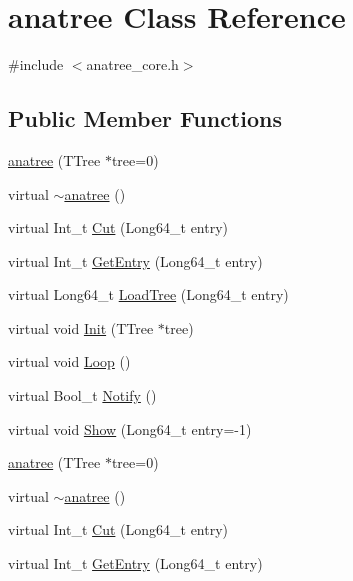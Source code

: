\hypertarget{classanatree}{\section{anatree Class Reference}
\label{classanatree}
}


{\ttfamily \#include $<$anatree\-\_\-core.\-h$>$}

\subsection*{Public Member Functions}
\begin{DoxyCompactItemize}
\item 
\hyperlink{classanatree_a681468883d8d6ce67ef59bc627336ae7}{anatree} (T\-Tree $\ast$tree=0)
\item 
virtual \hyperlink{classanatree_abf15dc362f9cb8d08ebcb1811c649a35}{$\sim$anatree} ()
\item 
virtual Int\-\_\-t \hyperlink{classanatree_af469e80902746c85deeab7a0e1b13b59}{Cut} (Long64\-\_\-t entry)
\item 
virtual Int\-\_\-t \hyperlink{classanatree_a3ead58a94b63a5af3188b31514693e39}{Get\-Entry} (Long64\-\_\-t entry)
\item 
virtual Long64\-\_\-t \hyperlink{classanatree_aa7d2bc2d5c95833df9fe2aa61b1f78c9}{Load\-Tree} (Long64\-\_\-t entry)
\item 
virtual void \hyperlink{classanatree_a751a3a2b9b93761020d01def145f96a9}{Init} (T\-Tree $\ast$tree)
\item 
virtual void \hyperlink{classanatree_af4572d1a51c63514970df7ea9d820b93}{Loop} ()
\item 
virtual Bool\-\_\-t \hyperlink{classanatree_a74d59c62b910973adb4f56454b644dd4}{Notify} ()
\item 
virtual void \hyperlink{classanatree_aa20c82c0f6f2e8a8ff1ee5ae999aebb9}{Show} (Long64\-\_\-t entry=-\/1)
\item 
\hyperlink{classanatree_a681468883d8d6ce67ef59bc627336ae7}{anatree} (T\-Tree $\ast$tree=0)
\item 
virtual \hyperlink{classanatree_abf15dc362f9cb8d08ebcb1811c649a35}{$\sim$anatree} ()
\item 
virtual Int\-\_\-t \hyperlink{classanatree_af469e80902746c85deeab7a0e1b13b59}{Cut} (Long64\-\_\-t entry)
\item 
virtual Int\-\_\-t \hyperlink{classanatree_a3ead58a94b63a5af3188b31514693e39}{Get\-Entry} (Long64\-\_\-t entry)
\item 

\end{DoxyCompactItemize}
